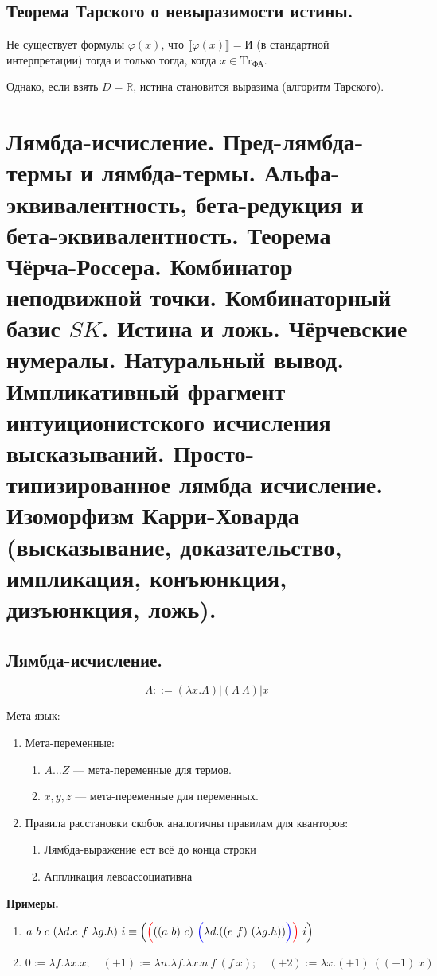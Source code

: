 \documentclass[10pt,a4paper,oneside]{article}
\begin{document}
\subsection{Теорема Тарского о невыразимости истины.}
Не существует формулы $\varphi(x)$, что $\llbracket \varphi(x) \rrbracket = \text{И}$ (в стандартной интерпретации) тогда и только
тогда, когда $x \in \text{Tr}_\text{ФА}$.

\noindent Однако, если взять $D = \mathbb{R}$, истина становится выразима (алгоритм Тарского).

\section{ Лямбда-исчисление. Пред-лямбда-термы и лямбда-термы. Альфа-эквивалентность, бета-редукция
и бета-эквивалентность. Теорема Чёрча-Россера. 
Комбинатор неподвижной точки. Комбинаторный базис $SK$.
Истина и ложь. Чёрчевские нумералы. 
Натуральный вывод. Импликативный фрагмент интуиционистского исчисления высказываний.
Просто-типизированное лямбда исчисление. Изоморфизм Карри-Ховарда (высказывание, доказательство, импликация, конъюнкция, дизъюнкция, ложь).}

\subsection{Лямбда-исчисление.}
$$\Lambda ::= (\lambda x.\Lambda) | (\Lambda\ \Lambda) | x$$

Мета-язык: 
\begin{enumerate}
\item Мета-переменные:\begin{enumerate}
\item $A\dots Z$ --- мета-переменные для термов. 
\item $x,y,z$ --- мета-переменные для переменных. 
\end{enumerate}

\item Правила расстановки скобок аналогичны правилам для кванторов:
\begin{enumerate}
\item Лямбда-выражение ест всё до конца строки
\item Аппликация левоассоциативна
\end{enumerate}
\end{enumerate}

{\bf Примеры.}
\begin{enumerate}
\item $a\ b\ c\ (\lambda d.e\ f\ \lambda g.h)\ i \equiv \Big({\color{red}\Big(}((a\ b)\ c)\ {\color{blue}\Big(}\lambda d.((e\ f)\ (\lambda g.h)){\color{blue}\Big)}{\color{red}\Big)}\ i\Big)$
\item $0 := \lambda f.\lambda x.x;\quad(+1) := \lambda n.\lambda f.\lambda x.n\ f\ (f\ x);\quad(+2) := \lambda x.(+1)\ ((+1)\ x)$
\end{enumerate}
\end{document}

